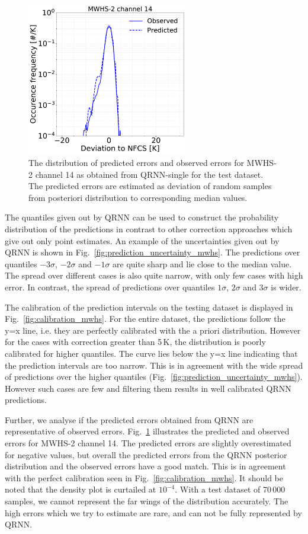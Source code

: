 \documentclass[amt, manuscript]{copernicus}
\begin{document}
\begin{figure}[t]
	\includegraphics[width=70mm]{Figures/deviation_posterior_mwhs_samples_14.pdf}	
	\caption{The distribution of predicted errors and observed errors for MWHS-2 channel 14 as obtained from QRNN-single for the test dataset. The predicted errors are estimated as deviation of random samples from posteriori distribution to corresponding median values.}
	\label{fig:predicted_errors_mwhs}	
\end{figure}

The quantiles given out by QRNN can be used to construct the probability distribution of the predictions in contrast to other correction approaches which give out only point estimates. An example of the uncertainties given out by QRNN is shown in Fig.~\ref{fig:prediction_uncertainty_mwhs}. The predictions over quantiles $-3\sigma$, $-2\sigma$ and $-1\sigma$ are quite sharp and lie close to the median value. The spread over different cases is also quite narrow, with only few cases with high error. In contrast, the spread of predictions over quantiles $1\sigma$, $2\sigma$ and $3\sigma$ is wider. 

The calibration of the prediction intervals on the testing dataset is displayed in Fig.~\ref{fig:calibration_mwhs}. For the entire dataset, the predictions follow the y=x line, i.e. they are perfectly calibrated with the a priori distribution. However for the cases with correction greater than 5\,K, the distribution is poorly calibrated for higher quantiles. The curve lies below the y=x line indicating that the prediction intervals are too narrow. This is in agreement with the wide spread of predictions over the  higher quantiles (Fig.~\ref{fig:prediction_uncertainty_mwhs}). However such cases are few and filtering them results in well calibrated QRNN predictions. 

Further, we analyse if the  predicted errors obtained from QRNN are representative of observed errors. Fig.~\ref{fig:predicted_errors_mwhs} illustrates the predicted and observed errors for MWHS-2 channel 14. The predicted errors are slightly overestimated for negative values, but overall the predicted errors from the QRNN posterior distribution and the observed errors have a good match. This is in agreement with the perfect calibration seen in Fig.~\ref{fig:calibration_mwhs}. It should be noted that the density plot is curtailed at $10^{-4}$. With a test dataset of 70\,000 samples, we cannot represent the far wings of the distribution accurately. The high errors which we try to estimate are rare, and can not be fully represented by QRNN. 
\end{document}
